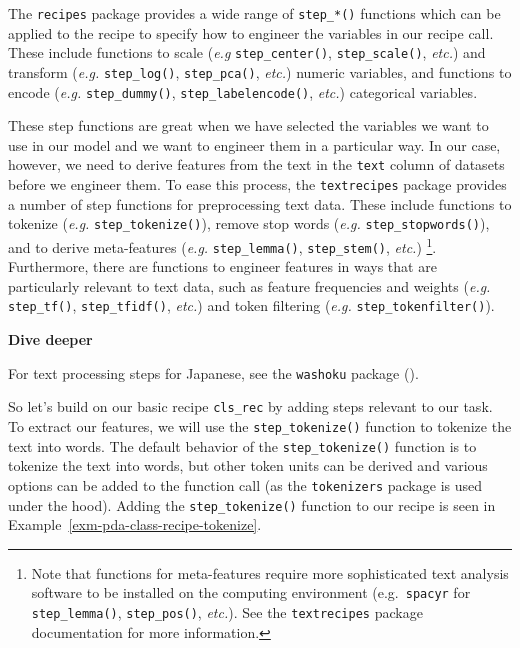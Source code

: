 \documentclass[
  letterpaper,
  DIV=11,
  numbers=noendperiod]{scrreprt}
\theoremstyle{definition}
\theoremstyle{remark}
\begin{document}
The \texttt{recipes} package provides a wide range of \texttt{step\_*()}
functions which can be applied to the recipe to specify how to engineer
the variables in our recipe call. These include functions to scale
(\emph{e.g} \texttt{step\_center()}, \texttt{step\_scale()},
\emph{etc.}) and transform (\emph{e.g.} \texttt{step\_log()},
\texttt{step\_pca()}, \emph{etc.}) numeric variables, and functions to
encode (\emph{e.g.} \texttt{step\_dummy()},
\texttt{step\_labelencode()}, \emph{etc.}) categorical variables.

These step functions are great when we have selected the variables we
want to use in our model and we want to engineer them in a particular
way. In our case, however, we need to derive features from the text in
the \texttt{text} column of datasets before we engineer them. To ease
this process, the \texttt{textrecipes} package provides a number of step
functions for preprocessing text data. These include functions to
tokenize (\emph{e.g.} \texttt{step\_tokenize()}), remove stop words
(\emph{e.g.} \texttt{step\_stopwords()}), and to derive meta-features
(\emph{e.g.} \texttt{step\_lemma()}, \texttt{step\_stem()}, \emph{etc.})
\footnote{Note that functions for meta-features require more
  sophisticated text analysis software to be installed on the computing
  environment (e.g.~\texttt{spacyr} for \texttt{step\_lemma()},
  \texttt{step\_pos()}, \emph{etc.}). See the \texttt{textrecipes}
  package documentation for more information.}. Furthermore, there are
functions to engineer features in ways that are particularly relevant to
text data, such as feature frequencies and weights (\emph{e.g.}
\texttt{step\_tf()}, \texttt{step\_tfidf()}, \emph{etc.}) and token
filtering (\emph{e.g.} \texttt{step\_tokenfilter()}).

\begin{tcolorbox}[enhanced jigsaw, leftrule=.75mm, colframe=quarto-callout-color-frame, colback=white, rightrule=.15mm, opacityback=0, arc=.35mm, breakable, bottomrule=.15mm, left=2mm, toprule=.15mm]

\textbf{ Dive deeper}

For text processing steps for Japanese, see the \texttt{washoku} package
().

\end{tcolorbox}

So let's build on our basic recipe \texttt{cls\_rec} by adding steps
relevant to our task. To extract our features, we will use the
\texttt{step\_tokenize()} function to tokenize the text into words. The
default behavior of the \texttt{step\_tokenize()} function is to
tokenize the text into words, but other token units can be derived and
various options can be added to the function call (as the
\texttt{tokenizers} package is used under the hood). Adding the
\texttt{step\_tokenize()} function to our recipe is seen in
Example~\ref{exm-pda-class-recipe-tokenize}.
\end{document}
